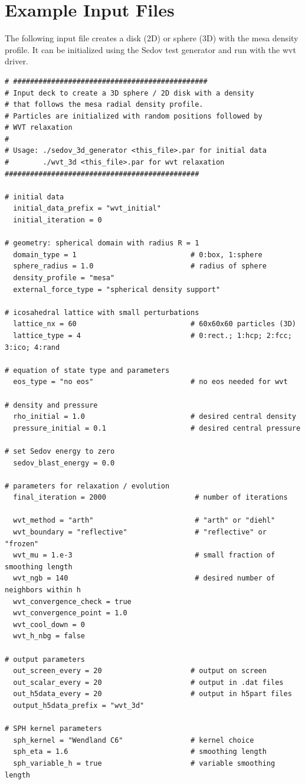 \documentclass{article}
\begin{document}
\section{Example Input Files}
The following input file creates a disk (2D) or sphere (3D) with the mesa density profile. 
It can be initialized using the Sedov test generator and run with the wvt driver. 
\begin{lstlisting}
# ##############################################
# Input deck to create a 3D sphere / 2D disk with a density 
# that follows the mesa radial density profile. 
# Particles are initialized with random positions followed by
# WVT relaxation 
#
# Usage: ./sedov_3d_generator <this_file>.par for initial data
#        ./wvt_3d <this_file>.par for wvt relaxation
##############################################

# initial data
  initial_data_prefix = "wvt_initial"
  initial_iteration = 0

# geometry: spherical domain with radius R = 1
  domain_type = 1                           # 0:box, 1:sphere
  sphere_radius = 1.0                       # radius of sphere 
  density_profile = "mesa"
  external_force_type = "spherical density support"

# icosahedral lattice with small perturbations
  lattice_nx = 60                           # 60x60x60 particles (3D)
  lattice_type = 4                          # 0:rect.; 1:hcp; 2:fcc; 3:ico; 4:rand

# equation of state type and parameters
  eos_type = "no eos"                       # no eos needed for wvt 

# density and pressure
  rho_initial = 1.0                         # desired central density
  pressure_initial = 0.1                    # desired central pressure 

# set Sedov energy to zero
  sedov_blast_energy = 0.0

# parameters for relaxation / evolution
  final_iteration = 2000                     # number of iterations 
  
  wvt_method = "arth"                        # "arth" or "diehl"
  wvt_boundary = "reflective"                # "reflective" or "frozen"
  wvt_mu = 1.e-3                             # small fraction of smoothing length 
  wvt_ngb = 140                              # desired number of neighbors within h 
  wvt_convergence_check = true
  wvt_convergence_point = 1.0
  wvt_cool_down = 0
  wvt_h_nbg = false

# output parameters
  out_screen_every = 20                     # output on screen
  out_scalar_every = 20                     # output in .dat files
  out_h5data_every = 20                     # output in h5part files
  output_h5data_prefix = "wvt_3d"

# SPH kernel parameters
  sph_kernel = "Wendland C6"                # kernel choice
  sph_eta = 1.6                             # smoothing length
  sph_variable_h = true                     # variable smoothing length
\end{lstlisting}
\end{document}
